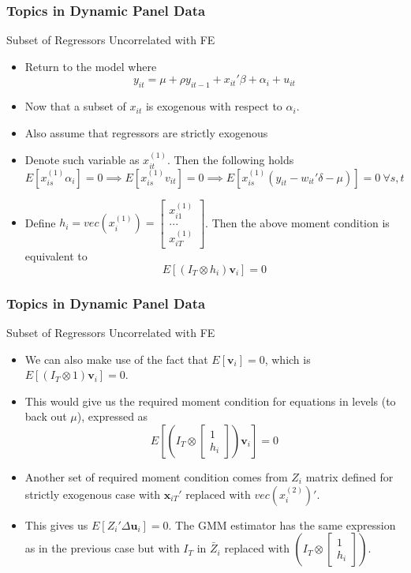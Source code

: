 \documentclass{beamer}
\begin{document}
\begin{frame}
\frametitle{Topics in Dynamic Panel Data}
Subset of Regressors Uncorrelated with FE
\begin{itemize}
\item Return to the model where
\[
y_{it}=\mu+\rho y_{it-1}+x_{it}'\beta+\alpha_i + u_{it}
\]
\item Now that a subset of $x_{it}$ is exogenous with respect to  $\alpha_i$.
\item Also assume that regressors are strictly exogenous
\item Denote such variable as $x_{it}^{(1)}$. Then the following holds
\[
E[x_{is}^{(1)}\alpha_i]=0\implies E[x_{is}^{(1)}v_{it}]=0\implies E[x_{is}^{(1)}(y_{it}-w_{it}'\delta-\mu)]=0 \ \forall s,t
\]
\item Define $h_i = vec(x_i^{(1)})=\begin{bmatrix} x_{i1}^{(1)} \\ ... \\ x_{iT}^{(1)}\end{bmatrix}$. Then the above moment condition is equivalent to
\[
E[(I_T\otimes h_i)\mathbf{v}_i]=0
\]
\end{itemize}
\end{frame}

\begin{frame}
\frametitle{Topics in Dynamic Panel Data}
Subset of Regressors Uncorrelated with FE
\begin{itemize}
\item We can also make use of the fact that $E[\mathbf{v}_i]=0$, which is $E[(I_T\otimes 1)\mathbf{v}_i]=0$. 
\item This would give us the required moment condition for equations in levels (to back out $\mu$), expressed as
\[
E\left[\left(I_T\otimes \begin{bmatrix}1 \\h_i\end{bmatrix}\right)\mathbf{v}_i\right]=0
\]
\item Another set of required moment condition comes from $Z_i$ matrix defined for strictly exogenous case with $\mathbf{x}_{iT}'$ replaced with $vec(x_i^{(2)})'$.
\item This gives us $E[Z_i'\Delta \mathbf{u}_i]=0$. The GMM estimator has the same expression as in the previous case but with $I_T$ in $\bar{Z}_i$ replaced with $\left(I_T\otimes \begin{bmatrix}1 \\h_i\end{bmatrix}\right)$.
\end{itemize}
\end{frame}
\end{document}

